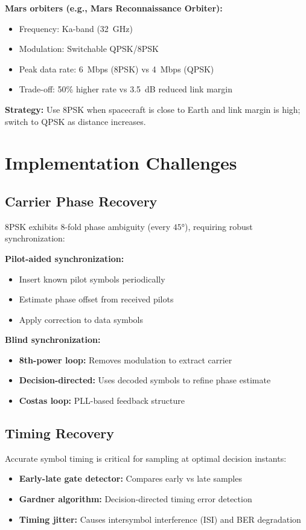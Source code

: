\textbf{Mars orbiters (e.g., Mars Reconnaissance Orbiter):}
\begin{itemize}
\item Frequency: Ka-band (32~GHz)
\item Modulation: Switchable QPSK/8PSK
\item Peak data rate: 6~Mbps (8PSK) vs 4~Mbps (QPSK)
\item Trade-off: 50\% higher rate vs 3.5~dB reduced link margin
\end{itemize}

\textbf{Strategy:} Use 8PSK when spacecraft is close to Earth and link margin is high; switch to QPSK as distance increases.

\section{Implementation Challenges}

\subsection{Carrier Phase Recovery}

8PSK exhibits 8-fold phase ambiguity (every $45°$), requiring robust synchronization:

\textbf{Pilot-aided synchronization:}
\begin{itemize}
\item Insert known pilot symbols periodically
\item Estimate phase offset from received pilots
\item Apply correction to data symbols
\end{itemize}

\textbf{Blind synchronization:}
\begin{itemize}
\item \textbf{8th-power loop:} Removes modulation to extract carrier
\item \textbf{Decision-directed:} Uses decoded symbols to refine phase estimate
\item \textbf{Costas loop:} PLL-based feedback structure
\end{itemize}

\subsection{Timing Recovery}

Accurate symbol timing is critical for sampling at optimal decision instants:
\begin{itemize}
\item \textbf{Early-late gate detector:} Compares early vs late samples
\item \textbf{Gardner algorithm:} Decision-directed timing error detection
\item \textbf{Timing jitter:} Causes intersymbol interference (ISI) and BER degradation
\end{itemize}

